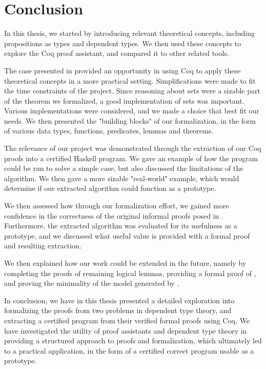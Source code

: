 \chapter{Conclusion}

In this thesis, we started by introducing relevant theoretical concepts,
including propositions as types and dependent types.
We then used these concepts to explore the Coq proof assistant,
and compared it to other related tools.

The case presented in 
provided an opportunity in using Coq to apply these theoretical concepts
in a more practical setting.
Simplifications were made to fit the time constraints of the project.
Since reasoning about sets were a sizable part of the theorem we formalized,
a good implementation of sets was important.
Various implementations were considered, and we made a choice that best fit our needs.
We then presented the "building blocks" of our formalization,
in the form of various data types, functions, predicates, lemmas and theorems.

The relevance of our project was demonstrated through the extraction
of our Coq proofs into a certified Haskell program.
We gave an example of how the program could be run to solve a simple case,
but also discussed the limitations of the algorithm.
We then gave a more sizable "real-world" example,
which would determine if our extracted algorithm could function as a prototype.

We then assessed how through our formalization effort,
we gained more confidence in the correctness of the original informal proofs posed in \cite{mbezem}.
Furthermore, the extracted algorithm was evaluated for its usefulness as a prototype,
and we discussed what useful value is provided with a formal proof and resulting extraction.

We then explained how our work could be extended in the future,
namely by completing the proofs of remaining logical lemmas,
providing a formal proof of , and proving the minimality of the model generated by .

In conclusion, we have in this thesis presented a detailed exploration into formalizing
the proofs from two problems in dependent type theory,
and extracting a certified program from their verified formal proofs using Coq.
We have investigated the utility of proof assistants and dependent type theory
in providing a structured approach to proofs and formalization,
which ultimately led to a practical application,
in the form of a certified correct program usable as a prototype.
